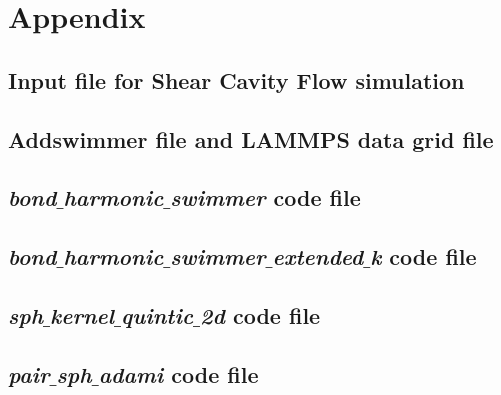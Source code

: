 \chapter{Appendix}
\label{sec:appendix}

\section{Input file for Shear Cavity Flow simulation}
\label{app:NURBSVolumenelement}




\section{Addswimmer file and LAMMPS data grid file}
\label{app:addswimmer}




\section{\textit{bond$\_$harmonic$\_$swimmer} code file}
\label{app:bond harmonic swimmer}



\section{\textit{bond$\_$harmonic$\_$swimmer$\_$extended$\_$k} code file}
\label{app:bond harmonic swimmer ext k}



\section{\textit{sph$\_$kernel$\_$quintic$\_$2d} code file}
\label{app:kernel function}



\section{\textit{pair$\_$sph$\_$adami} code file}
\label{app:adami}

